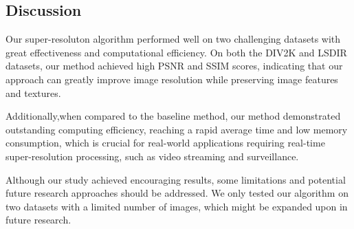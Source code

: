 \documentclass[10pt,twocolumn,letterpaper]{article}
\begin{document}
\subsection{Discussion}
Our super-resoluton algorithm performed well on two challenging datasets with great effectiveness and computational efficiency. On both the DIV2K and LSDIR datasets, our method achieved high PSNR and SSIM scores, indicating that our approach can greatly improve image resolution while preserving image features and textures.

Additionally,when compared to the baseline method, our method demonstrated outstanding computing efficiency, reaching a rapid average time and low memory consumption, which is crucial for real-world applications requiring real-time super-resolution processing, such as video streaming and surveillance.

Although our study achieved encouraging results, some limitations and potential future research approaches should be addressed. We only tested our algorithm on two datasets with a limited number of images, which might be expanded upon in future research.

{\small


}
\end{document}
